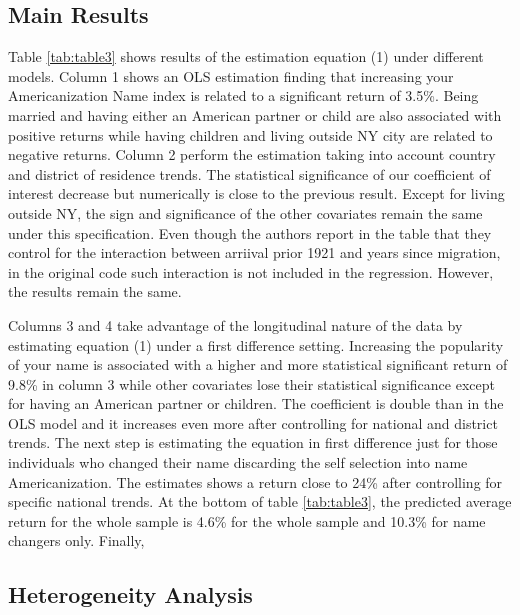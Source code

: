 \documentclass[12pt]{article}
\begin{document}
\subsection{Main Results}
Table \ref{tab:table3} shows results of the estimation equation (1) under different models. Column 1 shows an OLS estimation finding that increasing your Americanization Name index is related to a significant return of 3.5\%. Being married and having either an American partner or child are also associated with positive returns while having children and living outside NY city are related to negative returns. Column 2 perform the estimation taking into account country and district of residence trends. The statistical significance of our coefficient of interest decrease but numerically is close to the previous result. Except for living outside NY, the sign and significance of the other covariates remain the same under this specification. Even though the authors report in the table that they control for the interaction between arriival prior 1921 and years since migration, in the original code such interaction is not included in the regression. However, the results remain the same. 

\medskip

Columns 3 and 4 take advantage of the longitudinal nature of the data by estimating equation (1) under a first difference setting. Increasing the popularity of your name is associated with a higher and more statistical significant return of 9.8\% in column 3 while other covariates lose their statistical significance except for having an American partner or children. The coefficient is double than in the OLS model and it increases even more after controlling for national and district trends. The next step is estimating the equation in first difference just for those individuals who changed their name discarding the self selection into name Americanization. The estimates shows a return close to 24\% after controlling for specific national trends. At the bottom of table \ref{tab:table3}, the predicted average return for the whole sample is 4.6\% for the whole sample and 10.3\% for name changers only. Finally, 

\subsection{Heterogeneity Analysis}
\end{document}

